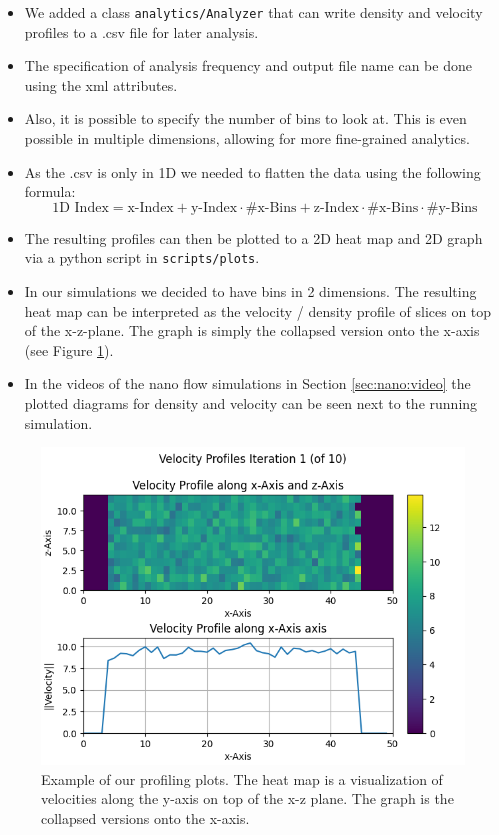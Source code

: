 \documentclass{article}
\begin{document}
    \begin{itemize}
        \item We added a class \texttt{analytics/Analyzer} that can write density and velocity profiles to a .csv file for later analysis.
        \item The specification of analysis frequency and output file name can be done using the xml attributes.
        \item Also, it is possible to specify the number of bins to look at. This is even possible in multiple dimensions, allowing for more fine-grained analytics.
        \item As the .csv is only in 1D we needed to flatten the data using the following formula:
        \[
        \text{1D Index} = \text{x-Index} + \text{y-Index} \cdot \text{\#x-Bins} + \text{z-Index} \cdot \text{\#x-Bins} \cdot \text{\#y-Bins}
        \]
        \item The resulting profiles can then be plotted to a 2D heat map and 2D graph via a python script in \texttt{scripts/plots}.
        \item In our simulations we decided to have bins in 2 dimensions. The resulting heat map can be interpreted as the velocity / density profile of slices on top of the x-z-plane. The graph is simply the collapsed version onto the x-axis (see Figure \ref{fig:plot_xmpl}).
        \item In the videos of the nano flow simulations in Section \ref{sec:nano:video} the plotted diagrams for density and velocity can be seen next to the running simulation.
    \end{itemize}

    \begin{figure}[H]
        \centering
        \includegraphics[width=1\textwidth]{../../res/Profile_example.png}
        \caption{Example of our profiling plots. The heat map is a visualization of velocities along the y-axis on top of the x-z plane. The graph is the collapsed versions onto the x-axis. }
        \label{fig:plot_xmpl}
    \end{figure}
\end{document}
